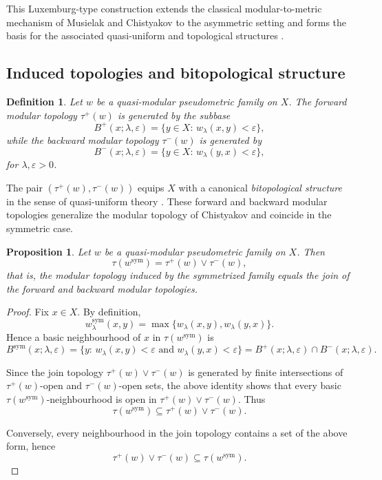 \documentclass[preprint,12pt]{elsarticle}
\newtheorem{proposition}[theorem]{Proposition}
\newtheorem{definition}[theorem]{Definition}
\begin{document}
\noindent
This Luxemburg-type construction extends the classical
modular-to-metric mechanism of Musielak and Chistyakov
\cite{Chistyakov2015,Musielak1983} to the asymmetric setting and forms
the basis for the associated quasi-uniform and topological structures
\cite{Majozi2025}.

\subsection{Induced topologies and bitopological structure}
\label{ssec:topologies}

\begin{definition}
\label{def:forward-backward-topologies}
Let $w$ be a quasi-modular pseudometric family on $X$.
The \emph{forward modular topology} $\tau^{+}(w)$ is generated by the
subbase
\[
B^{+}(x;\lambda,\varepsilon)
=\{y\in X:\, w_\lambda(x,y)<\varepsilon\},
\]
while the \emph{backward modular topology} $\tau^{-}(w)$ is generated by
\[
B^{-}(x;\lambda,\varepsilon)
=\{y\in X:\, w_\lambda(y,x)<\varepsilon\},
\]
for $\lambda,\varepsilon>0$.
\end{definition}

\noindent
The pair $(\tau^{+}(w),\tau^{-}(w))$ equips $X$ with a canonical
\emph{bitopological structure} in the sense of quasi-uniform theory
\cite{FletcherLindgren,Kunzi2001}.
These forward and backward modular topologies generalize the modular
topology of Chistyakov \cite{Chistyakov2015} and coincide in the
symmetric case.


\begin{proposition}
\label{prop:comparison-envelopes}
Let $w$ be a quasi-modular pseudometric family on $X$. Then
\[
\tau(w^{\mathrm{sym}})
=
\tau^{+}(w)\vee\tau^{-}(w),
\]
that is, the modular topology induced by the symmetrized family equals
the join of the forward and backward modular topologies.
\end{proposition}

\begin{proof}
Fix $x\in X$.
By definition,
\[
w^{\mathrm{sym}}_\lambda(x,y)
=
\max\{w_\lambda(x,y),w_\lambda(y,x)\}.
\]
Hence a basic neighbourhood of $x$ in $\tau(w^{\mathrm{sym}})$ is
\[
B^{\mathrm{sym}}(x;\lambda,\varepsilon)
=
\{y:\, w_\lambda(x,y)<\varepsilon \text{ and } w_\lambda(y,x)<\varepsilon\}
=
B^{+}(x;\lambda,\varepsilon)\cap B^{-}(x;\lambda,\varepsilon).
\]

Since the join topology $\tau^{+}(w)\vee\tau^{-}(w)$ is generated by
finite intersections of $\tau^{+}(w)$-open and $\tau^{-}(w)$-open sets,
the above identity shows that every basic $\tau(w^{\mathrm{sym}})$-neighbourhood
is open in $\tau^{+}(w)\vee\tau^{-}(w)$.
Thus
\[
\tau(w^{\mathrm{sym}})
\subseteq
\tau^{+}(w)\vee\tau^{-}(w).
\]

Conversely, every neighbourhood in the join topology contains a set of
the above form, hence
\[
\tau^{+}(w)\vee\tau^{-}(w)
\subseteq
\tau(w^{\mathrm{sym}}).
\]
\end{proof}
\end{document}
